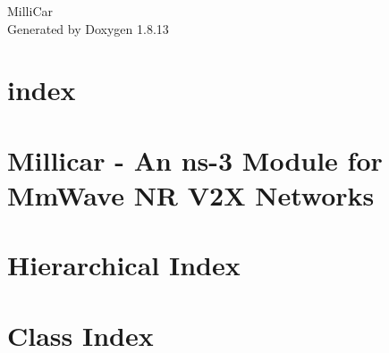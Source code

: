 \documentclass[twoside]{book}
\newcommand{\+}{\discretionary{\mbox{\scriptsize$\hookleftarrow$}}{}{}}
\newcommand{\clearemptydoublepage}{%
  \newpage{\pagestyle{empty}\cleardoublepage}%
}
\begin{document}
\hypersetup{pageanchor=false,
             bookmarksnumbered=true,
             pdfencoding=unicode
            }
\begin{titlepage}
\vspace*{7cm}
\begin{center}%
{\Large Milli\+Car }\\
\vspace*{1cm}
{\large Generated by Doxygen 1.8.13}\\
\end{center}
\end{titlepage}
\clearemptydoublepage
{}
\tableofcontents
\clearemptydoublepage
{}
\hypersetup{pageanchor=true}

\chapter{index}
\label{md_docs_index}

\chapter{Millicar -\/ An ns-\/3 Module for Mm\+Wave NR V2X Networks}
\label{md_README}

\chapter{Hierarchical Index}

\chapter{Class Index}

\end{document}

